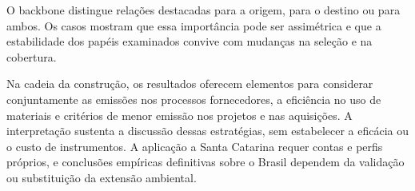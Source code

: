 \documentclass[11pt]{article}
\begin{document}
O backbone distingue relações destacadas para a origem, para o destino ou para ambos. Os casos mostram que essa importância pode ser assimétrica e que a estabilidade dos papéis examinados convive com mudanças na seleção e na cobertura.

Na cadeia da construção, os resultados oferecem elementos para considerar conjuntamente as emissões nos processos fornecedores, a eficiência no uso de materiais e critérios de menor emissão nos projetos e nas aquisições. A interpretação sustenta a discussão dessas estratégias, sem estabelecer a eficácia ou o custo de instrumentos. A aplicação a Santa Catarina requer contas e perfis próprios, e conclusões empíricas definitivas sobre o Brasil dependem da validação ou substituição da extensão ambiental.

\clearpage
\begingroup
{}
\raggedright
\printbibliography[title={Referências}]
\endgroup

\end{document}
